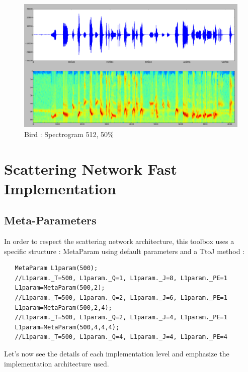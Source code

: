 \documentclass[a4paper]{report}
\begin{document}
\begin{figure}[H]
\begin{center}
\includegraphics[scale=0.21]{fftbird.png}\caption{Bird : Spectrogram 512, 50\% }
\end{center}
\end{figure}


\chapter{Scattering Network Fast Implementation}
\section{Meta-Parameters}
In order to respect the scattering network architecture, this toolbox uses a specific structure : MetaParam using default parameters and a TtoJ method :

\begin{lstlisting}
   MetaParam L1param(500);
   //L1param._T=500, L1param._Q=1, L1param._J=8, L1param._PE=1
   L1param=MetaParam(500,2);
   //L1param._T=500, L1param._Q=2, L1param._J=6, L1param._PE=1
   L1param=MetaParam(500,2,4);
   //L1param._T=500, L1param._Q=2, L1param._J=4, L1param._PE=1
   L1param=MetaParam(500,4,4,4);
   //L1param._T=500, L1param._Q=4, L1param._J=4, L1param._PE=4
\end{lstlisting}

Let's now see the details of each implementation level and emphasize the implementation architecture used.
\end{document}
